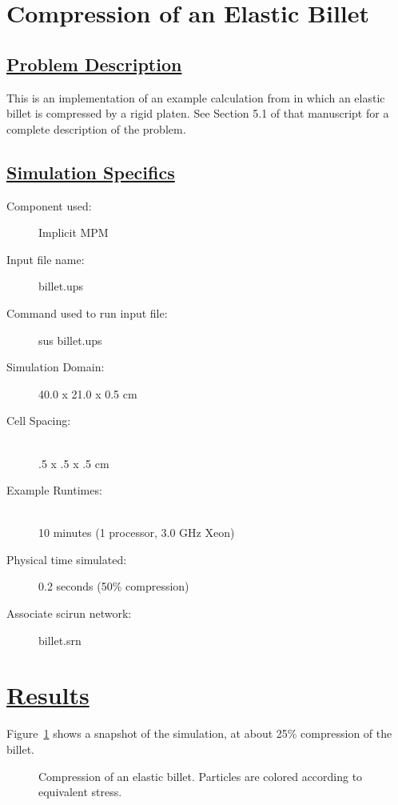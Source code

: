\documentclass[fleqn]{article}
\begin{document}
\section*{\center Compression of an Elastic Billet}
\subsection*{\underline{Problem Description}}
This is an implementation of an example calculation from
\cite{guilkeyIMPM} in which an elastic billet is compressed by a
rigid platen.  See Section 5.1 of that manuscript for a complete description
of the problem.
 
\subsection*{\underline{Simulation Specifics}}
\begin{description} 
\item [Component used:] \hfill Implicit MPM
\item [Input file name:] \hfill billet.ups
\item [Command used to run input file:]\hfill sus billet.ups
\item [Simulation Domain:]\hfill    40.0 x 21.0 x 0.5 cm

\item [Cell Spacing:]\hfill \\ 
.5 x .5 x .5 cm

\item [Example Runtimes:] \hfill \\
 10 minutes   (1 processor, 3.0 GHz Xeon)\\

\item [Physical time simulated:] \hfill 0.2 seconds (50\% compression)

\item [Associate scirun network:] \hfill billet.srn

\end{description}

\section*{\underline{Results}}

Figure~\ref{figdisks} shows a snapshot of the simulation, at about
25\% compression of the billet.
\begin{figure}[b]
  \center
  \caption{Compression of an elastic billet.  Particles are
colored according to equivalent stress.}
  \label{figdisks}
\end{figure}


\end{document}
